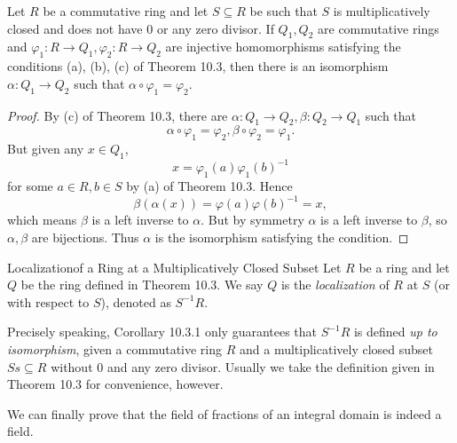\documentclass[pmath347]{subfiles}
\begin{document}
    \begin{cor}{}
        Let $R$ be a commutative ring and let $S\subseteq R$ be such that $S$ is multiplicatively closed and does not have $0$ or any zero divisor. If $Q_1,Q_2$ are commutative rings and $\varphi_1:R\to Q_1, \varphi_2:R\to Q_2$ are injective homomorphisms satisfying the conditions (a), (b), (c) of Theorem 10.3, then there is an isomorphism $\alpha:Q_1\to Q_2$ such that $\alpha\circ\varphi_1=\varphi_2$.
    \end{cor}	

    \begin{proof}
        By (c) of Theorem 10.3, there are $\alpha:Q_1\to Q_2, \beta:Q_2\to Q_1$ such that
        \begin{equation*}
            \alpha\circ\varphi_1=\varphi_2, \beta\circ\varphi_2=\varphi_1.
        \end{equation*}
        But given any $x\in Q_1$,
        \begin{equation*}
            x = \varphi_1\left( a \right) \varphi_1\left( b \right) ^{-1} 
        \end{equation*}
        for some $a\in R, b\in S$ by (a) of Theorem 10.3. Hence
        \begin{equation*}
            \beta\left( \alpha\left( x \right)  \right) = \varphi\left( a \right) \varphi\left( b \right) ^{-1} = x,
        \end{equation*}
        which means $\beta$ is a left inverse to $\alpha$. But by symmetry $\alpha$ is a left inverse to $\beta$, so $\alpha,\beta$ are bijections. Thus $\alpha$ is the isomorphism satisfying the condition.
    \end{proof}

    \begin{definition}{Localization}{of a Ring at a Multiplicatively Closed Subset}
        Let $R$ be a ring and let $Q$ be the ring defined in Theorem 10.3. We say $Q$ is the \emph{localization} of $R$ at $S$ (or with respect to $S$), denoted as $S^{-1} R$.
    \end{definition}

    \np Precisely speaking, Corollary 10.3.1 only guarantees that $S^{-1} R$ is defined \textit{up to isomorphism}, given a commutative ring $R$ and a multiplicatively closed subset $Ss\subseteq R$ without $0$ and any zero divisor. Usually we take the definition given in Theorem 10.3 for convenience, however.

    \np We can finally prove that the field of fractions of an integral domain is indeed a field.
\end{document}

